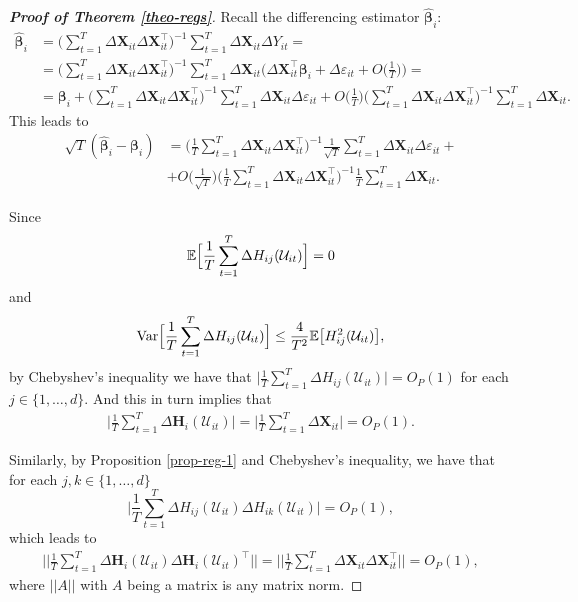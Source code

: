 \documentclass[a4paper,12pt]{article}
\begin{document}
\begin{proof}[\textnormal{\textbf{Proof of Theorem \ref{theo-regs}}}]
Recall the differencing estimator $\widehat{\bm{\beta}}_i$:
\begin{align*}
\widehat{\bm{\beta}}_i &= \Big( \sum_{t=1}^T \Delta \mathbf{X}_{it} \Delta \mathbf{X}_{it}^\top \Big)^{-1} \sum_{t=1}^T \Delta \mathbf{X}_{it} \Delta Y_{it} =\\
& =  \Big( \sum_{t=1}^T \Delta \mathbf{X}_{it} \Delta \mathbf{X}_{it}^\top \Big)^{-1} \sum_{t=1}^T \Delta \mathbf{X}_{it} \bigg(\Delta \mathbf{X}_{it}^\top \bm{\beta}_i + \Delta \varepsilon_{it} + O\Big(\frac{1}{T}\Big) \bigg) =\\
&= \bm{\beta}_i +  \Big( \sum_{t=1}^T \Delta \mathbf{X}_{it} \Delta \mathbf{X}_{it}^\top \Big)^{-1} \sum_{t=1}^T \Delta \mathbf{X}_{it} \Delta \varepsilon_{it}
+  O\Big(\frac{1}{T}\Big) \Big( \sum_{t=1}^T \Delta \mathbf{X}_{it} \Delta \mathbf{X}_{it}^\top \Big)^{-1} \sum_{t=1}^T \Delta \mathbf{X}_{it}. 
\end{align*}
This leads to
\begin{align*}
\sqrt{T}( \widehat{\bm{\beta}}_i - \bm{\beta}_i) &=  \Big(\frac{1}{T} \sum_{t=1}^T \Delta \mathbf{X}_{it} \Delta \mathbf{X}_{it}^\top \Big)^{-1}\frac{1}{\sqrt{T}} \sum_{t=1}^T \Delta \mathbf{X}_{it} \Delta \varepsilon_{it} +\\
&+  O\Big(\frac{1}{\sqrt{T}}\Big) \Big( \frac{1}{T}\sum_{t=1}^T \Delta \mathbf{X}_{it} \Delta \mathbf{X}_{it}^\top \Big)^{-1} \frac{1}{T}\sum_{t=1}^T \Delta \mathbf{X}_{it}.
\end{align*}

Since 
\[\mathbb{E} \Big[ \frac{1}{T}\sum_{t=1}^T \Delta H_{ij}(\mathcal{U}_{it})\Big] = 0\]
and 
\[\textnormal{Var} \Big[ \frac{1}{T}\sum_{t=1}^T \Delta H_{ij}(\mathcal{U}_{it})\Big] \leq \frac{4}{T^2} \mathbb{E}\big[H_{ij}^2(\mathcal{U}_{it})\big],\]
by Chebyshev's inequality we have that $\Big|\frac{1}{T}\sum_{t=1}^T \Delta H_{ij}(\mathcal{U}_{it})\Big| = O_P(1)$ for each $j\in\{1, \ldots, d\} $. And this in turn implies that
\begin{align}\label{proof-1}
\Big|\frac{1}{T}\sum_{t=1}^T \Delta \mathbf{H}_i (\mathcal{U}_{it}) \Big| = \Big| \frac{1}{T}\sum_{t=1}^T \Delta \mathbf{X}_{it}\Big| = O_P(1).
\end{align}


Similarly, by Proposition \ref{prop-reg-1} and Chebyshev's inequality, we have that for each $j, k\in\{1, \ldots, d\}$
\[  \Big|\frac{1}{T}\sum_{t=1}^T \Delta H_{ij}(\mathcal{U}_{it}) \Delta H_{ik}(\mathcal{U}_{it})\Big| = O_P(1),
\]
which leads to 
\begin{align}\label{proof-2}
\Big|\Big| \frac{1}{T}\sum_{t=1}^T \Delta \mathbf{H}_i (\mathcal{U}_{it})\Delta \mathbf{H}_i (\mathcal{U}_{it})^\top \Big|\Big| =\Big|\Big|\frac{1}{T}\sum_{t=1}^T\Delta \mathbf{X}_{it} \Delta \mathbf{X}_{it}^\top\Big|\Big| = O_P(1),
\end{align}
where $||A||$ with $A$ being a matrix is any matrix norm.


\end{proof}
\end{document}

